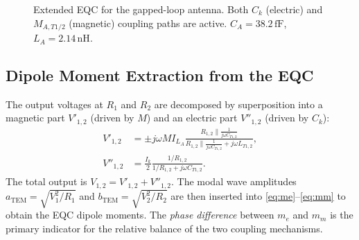 \documentclass[conference]{IEEEtran}
\begin{document}
\begin{figure}[t]
\centering
{}
\caption{Extended EQC for the gapped-loop antenna. Both $C_k$ (electric) and
  $M_{A,T1/2}$ (magnetic) coupling paths are active.
  $C_A\!=\!38.2\,\text{fF}$, $L_A\!=\!2.14\,\text{nH}$.}
\label{fig:eqc_loop}
\end{figure}

\subsection{Dipole Moment Extraction from the EQC}

The output voltages at $R_1$ and $R_2$ are decomposed by superposition into
a magnetic part $V'_{1,2}$ (driven by $M$) and an electric part $V''_{1,2}$
(driven by $C_k$):
\begin{subequations}\label{eq:voltages}
\begin{align}
  V'_{1,2} &= \pm j\omega M I_{L_A}
    \frac{R_{1,2} \| \tfrac{1}{j\omega C_{T1,2}}}
         {R_{1,2} \| \tfrac{1}{j\omega C_{T1,2}} + j\omega L_{T1,2}},
  \label{eq:Vprime}\\
  V''_{1,2} &= \frac{I_k}{2}
    \frac{1/R_{1,2}}{1/R_{1,2} + j\omega C_{T1,2}}.
  \label{eq:Vdprime}
\end{align}
\end{subequations}
The total output is $V_{1,2} = V'_{1,2} + V''_{1,2}$. The modal wave
amplitudes $a_\mathrm{TEM}\!=\!\sqrt{V_1^2/R_1}$ and
$b_\mathrm{TEM}\!=\!\sqrt{V_2^2/R_2}$ are then inserted into
\eqref{eq:me}--\eqref{eq:mm} to obtain the EQC dipole moments.
The \emph{phase difference} between $m_e$ and $m_m$ is the primary
indicator for the relative balance of the two coupling mechanisms.
\end{document}
